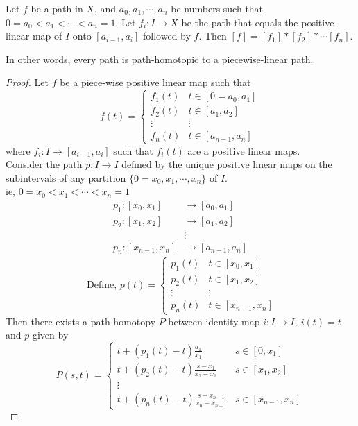 \begin{theorem}
	Let $f$ be a path in $X$, and $a_0, a_1, \cdots, a_n$ be numbers such that $0 = a_0 < a_1 < \cdots < a_n = 1$.
	Let $f_i : I \to X$ be the path that equals the positive linear map of $I$ onto $[a_{i-1},a_i]$ followed by $f$.
	Then $[f] = [f_1]\ast{}[f_2]\ast{}\cdots[f_n]$.
	\begin{commentary}
	In other words, every path is path-homotopic to a piecewise-linear path.
	\end{commentary}
\end{theorem}
\begin{proof}
	Let $f$ be a piece-wise positive linear map such that
	\[ f(t) = \begin{cases} f_1(t) & t \in [0=a_0,a_1] \\ f_2(t) & t \in [a_1,a_2] \\ \vdots & \vdots \\ f_n(t) & t \in [a_{n-1},a_n] \end{cases} \]
	where $f_i : I \to [a_{i-1},a_i]$ such that $f_i(t)$ are a positive linear maps. \\

	Consider the path $p : I \to I$  defined by the unique positive linear maps on the subintervals of any partition $\{ 0 = x_0, x_1, \cdots, x_n \}$ of $I$. \\
	ie, $0 = x_0 < x_1 < \cdots < x_n=1$
	\begin{align*}
		p_1 : [x_0,x_1] & \to [a_0,a_1] \\
		p_2 : [x_1,x_2] & \to [a_1,a_2] \\
		& \vdots \\
		p_n : [x_{n-1},x_n] & \to [a_{n-1},a_n]
	\end{align*}
	\[ \text{ Define, } p(t) = \begin{cases} p_1(t) & t \in [x_0,x_1] \\ p_2(t) & t \in [x_1,x_2] \\  \vdots  & \vdots \\ p_n(t) & t \in [x_{n-1},x_n]\end{cases} \]
	Then there exists a path homotopy $P$ between identity map $i : I \to I,\ i(t) = t$  and $p$ given by
	\[ P(s,t) = \begin{cases} t + (p_1(t)-t)\frac{a_1}{x_1} & s \in [0,x_1] \\ t + (p_2(t)-t)\frac{s-x_1}{x_2-x_1} & s \in [x_1,x_2] \\ \vdots & \\ t + (p_n(t)-t)\frac{s-x_{n-1}}{x_n - x_{n-1}} & s \in [x_{n-1},x_n] \end{cases} \]
	

\end{proof}
